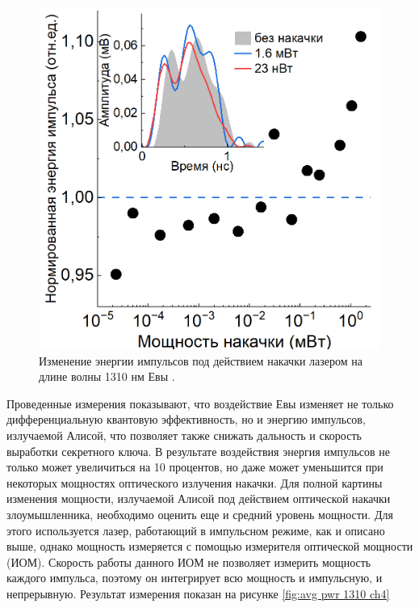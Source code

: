 \begin{figure}
    \centering
    \includegraphics[width=\linewidth]{images/1310_энергия.png}
    \caption{Изменение энергии импульсов под действием накачки лазером на длине волны 1310 нм Евы \cite{fadeev2025}.}
    \label{fig:energy 1310 ch4}
\end{figure}
Проведенные измерения показывают, что воздействие Евы изменяет не только дифференциальную квантовую эффективность, но и энергию импульсов, излучаемой Алисой, что позволяет также снижать дальность и скорость выработки секретного ключа. В результате воздействия энергия импульсов не только может увеличиться на 10 процентов, но даже может уменьшится при некоторых мощностях оптического излучения накачки.
\newline Для полной картины изменения мощности, излучаемой Алисой под действием оптической накачки злоумышленника, необходимо оценить еще и средний уровень мощности. Для этого используется лазер, работающий в импульсном режиме, как и описано выше, однако мощность измеряется с помощью измерителя оптической мощности (ИОМ). Скорость работы данного ИОМ не позволяет измерить мощность каждого импульса, поэтому он интегрирует всю мощность и импульсную, и непрерывную. Результат измерения показан на рисунке \ref{fig:avg pwr 1310 ch4} 
